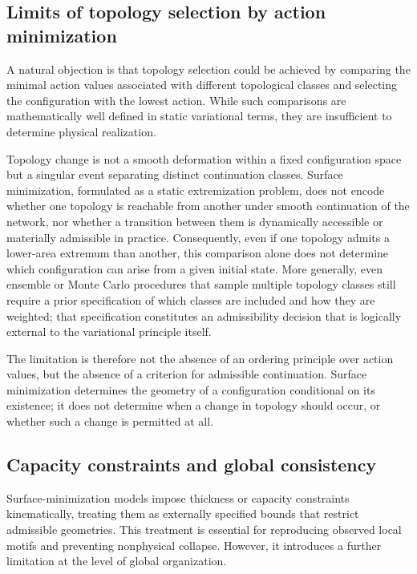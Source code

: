\subsection{Limits of topology selection by action minimization}

A natural objection is that topology selection could be achieved by comparing the minimal action values associated with different topological classes and selecting the configuration with the lowest action. While such comparisons are mathematically well defined in static variational terms, they are insufficient to determine physical realization.

Topology change is not a smooth deformation within a fixed configuration space but a singular event separating distinct continuation classes. Surface minimization, formulated as a static extremization problem, does not encode whether one topology is reachable from another under smooth continuation of the network, nor whether a transition between them is dynamically accessible or materially admissible in practice. Consequently, even if one topology admits a lower-area extremum than another, this comparison alone does not determine which configuration can arise from a given initial state. More generally, even ensemble or Monte Carlo procedures that sample multiple topology classes still require a prior specification of which classes are included and how they are weighted; that specification constitutes an admissibility decision that is logically external to the variational principle itself.

The limitation is therefore not the absence of an ordering principle over action values, but the absence of a criterion for admissible continuation. Surface minimization determines the geometry of a configuration conditional on its existence; it does not determine when a change in topology should occur, or whether such a change is permitted at all.

\subsection{Capacity constraints and global consistency}

Surface-minimization models impose thickness or capacity constraints kinematically, treating them as externally specified bounds that restrict admissible geometries. This treatment is essential for reproducing observed local motifs and preventing nonphysical collapse. However, it introduces a further limitation at the level of global organization.

